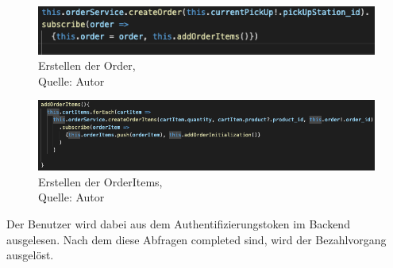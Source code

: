 \begin{figure}[H]
	\centering
	\includegraphics[scale=0.5]{images/createOrder.PNG}
	\caption[Erstellen der Order]{Erstellen der Order,\\ Quelle: Autor}
	\label{img: createOrder}
\end{figure}
\begin{figure}[H]
	\centering
	\includegraphics[width=1\textwidth]{images/createOrderItems.PNG}
	\caption[Erstellen der OrderItems]{Erstellen der OrderItems,\\ Quelle: Autor}
	\label{img: createOrderItems}
\end{figure}

Der Benutzer wird dabei aus dem Authentifizierungstoken im Backend ausgelesen. 
Nach dem diese Abfragen completed sind, wird der Bezahlvorgang ausgelöst. 

